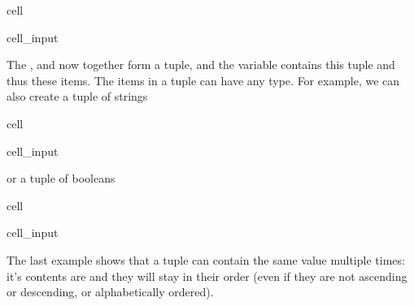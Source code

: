 \documentclass[letterpaper,10pt,english]{jupyterBook}
\begin{document}
\begin{sphinxuseclass}{cell}\begin{sphinxVerbatimInput}

\begin{sphinxuseclass}{cell_input}
\begin{sphinxVerbatim}[commandchars=\\\{\}]
    
\end{sphinxVerbatim}

\end{sphinxuseclass}\end{sphinxVerbatimInput}

\end{sphinxuseclass}
\sphinxAtStartPar
The ,  and  now together form a tuple, and the variable  contains this tuple and thus these items. The items in a tuple can have any type. For example, we can also create a tuple of strings

\begin{sphinxuseclass}{cell}\begin{sphinxVerbatimInput}

\begin{sphinxuseclass}{cell_input}
\begin{sphinxVerbatim}[commandchars=\\\{\}]
    
\end{sphinxVerbatim}

\end{sphinxuseclass}\end{sphinxVerbatimInput}

\end{sphinxuseclass}
\sphinxAtStartPar
or a tuple of booleans

\begin{sphinxuseclass}{cell}\begin{sphinxVerbatimInput}

\begin{sphinxuseclass}{cell_input}
\begin{sphinxVerbatim}[commandchars=\\\{\}]
    
\end{sphinxVerbatim}

\end{sphinxuseclass}\end{sphinxVerbatimInput}

\end{sphinxuseclass}
\sphinxAtStartPar
The last example shows that a tuple can contain the same value multiple times: it’s contents are  and they will stay in their order (even if they are not ascending or descending, or alphabetically ordered).
\end{document}
